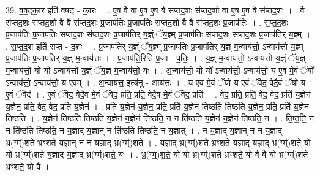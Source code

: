 \documentclass[17pt]{extarticle}
\begin{document}
39. व॒ष॒ट्का॒र इति॑ वषट् - का॒रः । . ए॒ष वै वा ए॒ष ए॒ष वै स॑प्तद॒शः स॑प्तद॒शो वा ए॒ष ए॒ष वै स॑प्तद॒शः । . वै स॑प्तद॒शः स॑प्तद॒शो वै वै स॑प्तद॒शः प्र॒जाप॑तिः प्र॒जाप॑तिः सप्तद॒शो वै वै स॑प्तद॒शः प्र॒जाप॑तिः । . स॒प्त॒द॒शः प्र॒जाप॑तिः प्र॒जाप॑तिः सप्तद॒शः स॑प्तद॒शः प्र॒जाप॑तिर् य॒ज्ञ्ं ॅय॒ज्ञ्म् प्र॒जाप॑तिः सप्तद॒शः स॑प्तद॒शः प्र॒जाप॑तिर् य॒ज्ञ्म् । . स॒प्त॒द॒श इति॑ सप्त - द॒शः । . प्र॒जाप॑तिर् य॒ज्ञ्ं ॅय॒ज्ञ्म् प्र॒जाप॑तिः प्र॒जाप॑तिर् य॒ज्ञ् म॒न्वाय॑त्तो॒ ऽन्वाय॑त्तो य॒ज्ञ्म् प्र॒जाप॑तिः प्र॒जाप॑तिर् य॒ज्ञ् म॒न्वाय॑त्तः । . प्र॒जाप॑ति॒रिति॑ प्र॒जा - प॒तिः॒ । . य॒ज्ञ् म॒न्वाय॑त्तो॒ ऽन्वाय॑त्तो य॒ज्ञ्ं ॅय॒ज्ञ् म॒न्वाय॑त्तो॒ यो यो᳚ ऽन्वाय॑त्तो य॒ज्ञ्ं ॅय॒ज्ञ् म॒न्वाय॑त्तो॒ यः । . अ॒न्वाय॑त्तो॒ यो यो᳚ ऽन्वाय॑त्तो॒ ऽन्वाय॑त्तो॒ य ए॒व मे॒वं ॅयो᳚ ऽन्वाय॑त्तो॒ ऽन्वाय॑त्तो॒ य ए॒वम् । . अ॒न्वाय॑त्त॒ इत्य॑नु - आय॑त्तः । . य ए॒व मे॒वं ॅयो य ए॒वं ॅवेद॒ वेदै॒वं ॅयो य ए॒वं ॅवेद॑ । . ए॒वं ॅवेद॒ वेदै॒व मे॒वं ॅवेद॒ प्रति॒ प्रति॒ वेदै॒व मे॒वं ॅवेद॒ प्रति॑ । . वेद॒ प्रति॒ प्रति॒ वेद॒ वेद॒ प्रति॑ य॒ज्ञेन॑ य॒ज्ञेन॒ प्रति॒ वेद॒ वेद॒ प्रति॑ य॒ज्ञेन॑ । . प्रति॑ य॒ज्ञेन॑ य॒ज्ञेन॒ प्रति॒ प्रति॑ य॒ज्ञेन॑ तिष्ठति तिष्ठति य॒ज्ञेन॒ प्रति॒ प्रति॑ य॒ज्ञेन॑ तिष्ठति । . य॒ज्ञेन॑ तिष्ठति तिष्ठति य॒ज्ञेन॑ य॒ज्ञेन॑ तिष्ठति॒ न न ति॑ष्ठति य॒ज्ञेन॑ य॒ज्ञेन॑ तिष्ठति॒ न । . ति॒ष्ठ॒ति॒ न न ति॑ष्ठति तिष्ठति॒ न य॒ज्ञाद् य॒ज्ञान् न ति॑ष्ठति तिष्ठति॒ न य॒ज्ञात् । . न य॒ज्ञाद् य॒ज्ञान् न न य॒ज्ञाद् भ्र(ग्म्॑)शते भ्रꣳशते य॒ज्ञान् न न य॒ज्ञाद् भ्र(ग्म्॑)शते । . य॒ज्ञाद् भ्र(ग्म्॑)शते भ्रꣳशते य॒ज्ञाद् य॒ज्ञाद् भ्र(ग्म्॑)शते॒ यो यो भ्र(ग्म्॑)शते य॒ज्ञाद् य॒ज्ञाद् भ्र(ग्म्॑)शते॒ यः । . भ्र॒(ग्म्॒)श॒ते॒ यो यो भ्र(ग्म्॑)शते भ्रꣳशते॒ यो वै वै यो भ्र(ग्म्॑)शते भ्रꣳशते॒ यो वै । \newline
\end{document}
